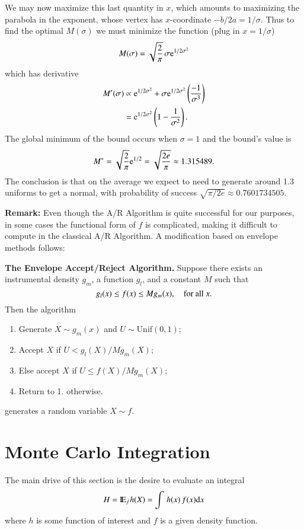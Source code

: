 \documentclass[captions=tableheading]{scrbook}
\begin{document}
We may now maximize this last quantity in $x$, which amounts to maximizing the parabola in the exponent, whose vertex has $x$-coordinate $-b/2a = 1/\sigma$. Thus to find the optimal $M(\sigma)$ we must minimize the function (plug in $x=1/\sigma$) 
\[
M(\sigma)=\sqrt{\frac{2}{\pi}}\,\sigma \mathrm{e}^{1/2\sigma^{2}}
\]
which has derivative 
\begin{align*}
M'(\sigma) & \propto \mathrm{e}^{1/2\sigma^{2}}+\sigma \mathrm{e}^{1/2\sigma^{2}}\left(\frac{-1}{\sigma^{3}}\right)\\
 & = \mathrm{e}^{1/2\sigma^{2}}\left(1-\frac{1}{\sigma^{2}}\right).
\end{align*}
The global minimum of the bound occurs when $\sigma=1$ and the bound's value is 
\[
M^{\ast}=\sqrt{\frac{2}{\pi}}\mathrm{e}^{1/2}=\sqrt{\frac{2e}{\pi}}\approx 1.315489.
\]
The conclusion is that on the average we expect to need to generate around 1.3 uniforms to get a normal, with probability of success $\sqrt{\pi/2e}\approx0.7601734505$.
 
\textbf{Remark:} Even though the A/R Algorithm is quite successful for our purposes, in some cases the functional form of $f$ is complicated, making it difficult to compute in the classical A/R Algorithm. A modification based on envelope methods follows:

\textbf{The Envelope Accept/Reject Algorithm.} Suppose there exists an instrumental density $g_{m}$, a function $g_{l}$, and a constant $M$ such that 
\[
g_{l}(x)\leq f(x)\leq Mg_{m}(x),\quad\mbox{for all \ensuremath{x}}.
\]
Then the algorithm

\begin{enumerate}
\item Generate $X\sim g_{m}(x)$ and $U\sim\mathrm{Unif}(0,1)$;
\item Accept $X$ if $U < g_{l}(X)/Mg_{m}(X)$;
\item Else accept $X$ if $U \leq f(X)/M g_{m}(X)$;
\item Return to 1. otherwise.
\end{enumerate}

generates a random variable $X \sim f$.
\chapter{Monte Carlo Integration}
\label{sec-3}


The main drive of this section is the desire to evaluate an integral
\[
H=\mathrm{I\hspace{-1.5pt}E}_{f}h(X)=\int\, h(x)\, f(x)\mathrm{d} x
\]
 where $h$ is some function of interest and $f$ is a given density function.
\end{document}
